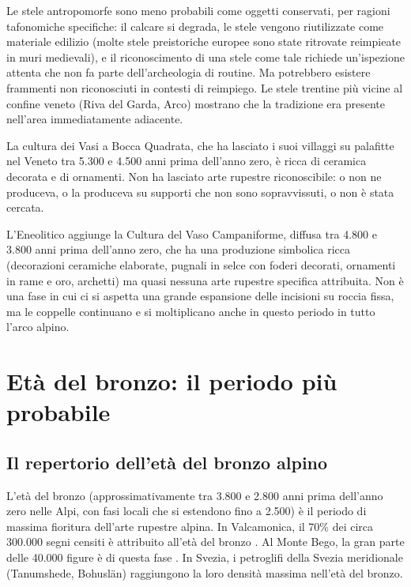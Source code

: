 Le stele antropomorfe sono meno probabili come oggetti conservati, per ragioni tafonomiche specifiche: il calcare si degrada, le stele vengono riutilizzate come materiale edilizio (molte stele preistoriche europee sono state ritrovate reimpieate in muri medievali), e il riconoscimento di una stele come tale richiede un'ispezione attenta che non fa parte dell'archeologia di routine. Ma potrebbero esistere frammenti non riconosciuti in contesti di reimpiego. Le stele trentine più vicine al confine veneto (Riva del Garda, Arco) mostrano che la tradizione era presente nell'area immediatamente adiacente.

La cultura dei Vasi a Bocca Quadrata, che ha lasciato i suoi villaggi su palafitte nel Veneto tra 5.300 e 4.500 anni prima dell'anno zero, è ricca di ceramica decorata e di ornamenti. Non ha lasciato arte rupestre riconoscibile: o non ne produceva, o la produceva su supporti che non sono sopravvissuti, o non è stata cercata.

L'Eneolitico aggiunge la Cultura del Vaso Campaniforme, diffusa tra 4.800 e 3.800 anni prima dell'anno zero, che ha una produzione simbolica ricca (decorazioni ceramiche elaborate, pugnali in selce con foderi decorati, ornamenti in rame e oro, archetti) ma quasi nessuna arte rupestre specifica attribuita. Non è una fase in cui ci si aspetta una grande espansione delle incisioni su roccia fissa, ma le coppelle continuano e si moltiplicano anche in questo periodo in tutto l'arco alpino.

\section{Età del bronzo: il periodo più probabile}

\subsection{Il repertorio dell'età del bronzo alpino}

L'età del bronzo (approssimativamente tra 3.800 e 2.800 anni prima dell'anno zero nelle Alpi, con fasi locali che si estendono fino a 2.500) è il periodo di massima fioritura dell'arte rupestre alpina. In Valcamonica, il 70\% dei circa 300.000 segni censiti è attribuito all'età del bronzo \citep{demarinis2012}. Al Monte Bego, la gran parte delle 40.000 figure è di questa fase \citep{lumley1995}. In Svezia, i petroglifi della Svezia meridionale (Tanumshede, Bohuslän) raggiungono la loro densità massima nell'età del bronzo.

